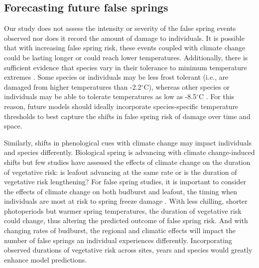 \documentclass{article}\usepackage[]{graphicx}\usepackage[]{color}
\begin{document}
\subsection*{Forecasting future false springs}
Our study does not assess the intensity or severity of the false spring events observed nor does it record the amount of damage to individuals. It is possible that with increasing false spring risk, these events coupled with climate change could be lasting longer or could reach lower temperatures. Additionally, there is sufficient evidence that species vary in their tolerance to minimum temperature extremes \citep{Korner2016, Lenz2013, Zhuo2018,bennett2018globtherm}. Some species or individuals may be less frost tolerant (i.e., are damaged from higher temperatures than -2.2$^{\circ}$C), whereas other species or individuals may be able to tolerate temperatures as low as -8.5$^{\circ}$C \citep{Lenz2016}. %
For this reason, future models should ideally incorporate species-specific temperature thresholds to best capture the shifts in false spring risk of damage over time and space. 

Similarly, shifts in phenological cues with climate change may impact individuals and species differently. Biological spring is advancing with climate change-induced shifts but few studies have assessed the effects of climate change on the duration of vegetative risk: is leafout advancing at the same rate or is the duration of vegetative risk lengthening? For false spring studies, it is important to consider the effects of climate change on both budburst and leafout, the timing when individuals are most at risk to spring freeze damage \citep{Chamberlain2019,Lenz2016}. With less chilling, shorter photoperiods but warmer spring temperatures, the duration of vegetative risk could change, thus altering the predicted outcome of false spring risk. And with changing rates of budburst, the regional and climatic effects will impact the number of false springs an individual experiences differently. Incorporating observed durations of vegetative risk across sites, years and species would greatly enhance model predictions. 
\end{document}
